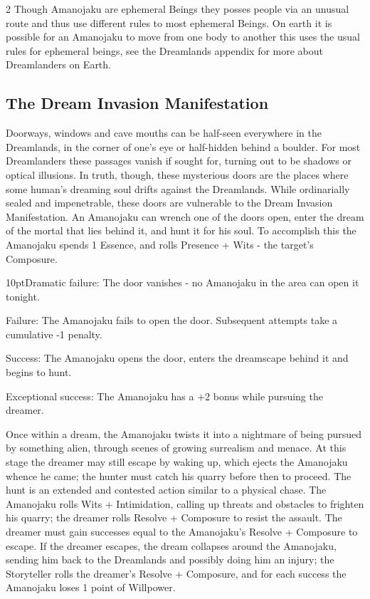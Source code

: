 \begin{multicols}{2}
Though Amanojaku are ephemeral Beings they posses people via an unusual route and thus use different rules to most ephemeral Beings. On earth it is possible for an Amanojaku to move from one body to another this uses the usual rules for ephemeral beings, see the Dreamlands appendix for more about Dreamlanders on Earth. 

\subsection*{The Dream Invasion Manifestation}

Doorways, windows and cave mouths can be half-seen everywhere in the Dreamlands, in the corner of one's eye or half-hidden behind a boulder. For most Dreamlanders these passages vanish if sought for, turning out to be shadows or optical illusions. In truth, though, these mysterious doors are the places where some human's dreaming soul drifts against the Dreamlands. While ordinarially sealed and impenetrable, these doors are vulnerable to the Dream Invasion Manifestation. An Amanojaku can wrench one of the doors open, enter the dream of the mortal that lies behind it, and hunt it for his soul. To accomplish this the Amanojaku spends 1 Essence, and rolls Presence + Wits - the target's Composure.

    \begin{myindentpar}{10pt}Dramatic failure: The door vanishes - no Amanojaku in the area can open it tonight. 
    
    Failure: The Amanojaku fails to open the door. Subsequent attempts take a cumulative -1 penalty. 
    
    Success: The Amanojaku opens the door, enters the dreamscape behind it and begins to hunt. 
    
    Exceptional success: The Amanojaku has a +2 bonus while pursuing the dreamer. \end{myindentpar}    

Once within a dream, the Amanojaku twists it into a nightmare of being pursued by something alien, through scenes of growing surrealism and menace. At this stage the dreamer may still escape by waking up, which ejects the Amanojaku whence he came; the hunter must catch his quarry before then to proceed. The hunt is an extended and contested action similar to a physical chase. The Amanojaku rolls Wits + Intimidation, calling up threats and obstacles to frighten his quarry; the dreamer rolls Resolve + Composure to resist the assault. The dreamer must gain successes equal to the Amanojaku's Resolve + Composure to escape. If the dreamer escapes, the dream collapses around the Amanojaku, sending him back to the Dreamlands and possibly doing him an injury; the Storyteller rolls the dreamer's Resolve + Composure, and for each success the Amanojaku loses 1 point of Willpower.


\end{multicols}
